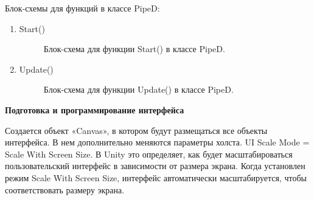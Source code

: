 \documentclass[14pt, oneside]{altsu-report}
\begin{document}
Блок-схемы для функций в классе PipeD:
\begin{enumerate}
\item Start()

\begin{figure}[H]
\caption{Блок-схема для функции  Start() в классе PipeD.}
\end{figure}

\item Update()

\begin{figure}[H]
\caption{Блок-схема для функции Update() в классе PipeD.}
\end{figure}

\end{enumerate}

\textbf{Подготовка и программирование интерфейса}

Создается объект «Canvas», в котором будут размещаться все объекты интерфейса. В нем дополнительно меняются параметры холста. UI Scale Mode = Scale With Screen Size. В Unity это определяет, как будет масштабироваться пользовательский интерфейс в зависимости от размера экрана. Когда установлен режим Scale With Screen Size, интерфейс автоматически масштабируется, чтобы соответствовать размеру экрана. 
\end{document}
